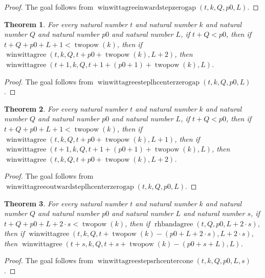 \documentclass[11pt]{article}
\newtheorem{theorem}{Theorem}[section]
\theoremstyle{definition}
\begin{document}
\begin{proof}
The goal follows from \(\operatorname{winwittagreeinwardstepzerogap}(t, k, Q, p0, L)\).
\end{proof}
\begin{theorem}
\label{ll:paper:winwittagree-step-lhcenter-zero-gap}
For every natural number \(t\) and natural number \(k\) and natural number \(Q\) and natural number \(p0\) and natural number \(L\), if \(t + Q < p0\), then if \(t + Q + p0 + L + 1 < \operatorname{twopow}(k)\), then if \(\operatorname{winwittagree}(t, k, Q, t + p0 + \operatorname{twopow}(k), L + 2)\), then \(\operatorname{winwittagree}(t + 1, k, Q, t + 1 + (p0 + 1) + \operatorname{twopow}(k), L)\).
\end{theorem}
\begin{proof}
The goal follows from \(\operatorname{winwittagreesteplhcenterzerogap}(t, k, Q, p0, L)\).
\end{proof}
\begin{theorem}
\label{ll:paper:winwittagree-outward-step-lhcenter-zero-gap}
For every natural number \(t\) and natural number \(k\) and natural number \(Q\) and natural number \(p0\) and natural number \(L\), if \(t + Q < p0\), then if \(t + Q + p0 + L + 1 < \operatorname{twopow}(k)\), then if \(\operatorname{winwittagree}(t, k, Q, t + p0 + \operatorname{twopow}(k), L + 1)\), then if \(\operatorname{winwittagree}(t + 1, k, Q, t + 1 + (p0 + 1) + \operatorname{twopow}(k), L)\), then \(\operatorname{winwittagree}(t, k, Q, t + p0 + \operatorname{twopow}(k), L + 2)\).
\end{theorem}
\begin{proof}
The goal follows from \(\operatorname{winwittagreeoutwardsteplhcenterzerogap}(t, k, Q, p0, L)\).
\end{proof}
\begin{theorem}
\label{ll:paper:winwittagree-steps-rhcenter-cone}
For every natural number \(t\) and natural number \(k\) and natural number \(Q\) and natural number \(p0\) and natural number \(L\) and natural number \(s\), if \(t + Q + p0 + L + 2 \cdot s < \operatorname{twopow}(k)\), then if \(\operatorname{rhbandagree}(t, Q, p0, L + 2 \cdot s)\), then if \(\operatorname{winwittagree}(t, k, Q, t + \operatorname{twopow}(k) - (p0 + L + 2 \cdot s), L + 2 \cdot s)\), then \(\operatorname{winwittagree}(t + s, k, Q, t + s + \operatorname{twopow}(k) - (p0 + s + L), L)\).
\end{theorem}
\begin{proof}
The goal follows from \(\operatorname{winwittagreestepsrhcentercone}(t, k, Q, p0, L, s)\).
\end{proof}
\end{document}
